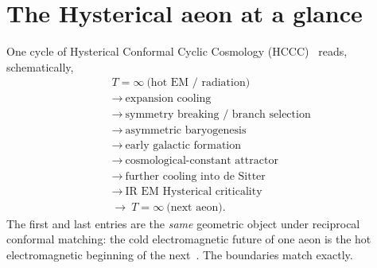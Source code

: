 \documentclass[11pt]{article}
\begin{document}
\section{The Hysterical aeon at a glance}
\label{sec:cycle-glance}
One cycle of Hysterical Conformal Cyclic Cosmology (HCCC)~\cite{boyd2026ccc}
reads, schematically,
\begin{equation}
\label{eq:cycle}
\boxed{\begin{aligned}
&T=\infty\ \text{(hot EM / radiation)}\\
&\longrightarrow\ \text{expansion cooling}\\
&\longrightarrow\ \text{symmetry breaking / branch selection}\\
&\longrightarrow\ \text{asymmetric baryogenesis}\\
&\longrightarrow\ \text{early galactic formation}\\
&\longrightarrow\ \text{cosmological-constant attractor}\\
&\longrightarrow\ \text{further cooling into de~Sitter}\\
&\longrightarrow\ \text{IR EM Hysterical criticality}\\
&\longrightarrow\ T=\infty\ \text{(next aeon)}.
\end{aligned}}
\end{equation}
The first and last entries are the \emph{same} geometric object under reciprocal
conformal matching: the cold electromagnetic future of one aeon is the hot
electromagnetic beginning of the next~\cite{boyd2026ccc,Penrose2010,Penrose2013CCC}.
The boundaries match exactly.
\end{document}
